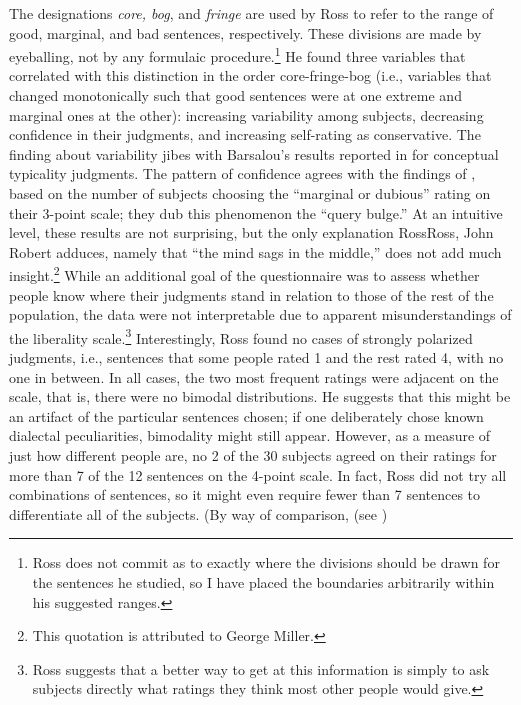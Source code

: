 The designations \textit{core, bog}, and \textit{fringe} are used by Ross to refer to the range of good, marginal, and bad sentences, respectively. These divisions are made by eyeballing, not by any formulaic procedure.\footnote{Ross does not commit as to exactly where the divisions should be drawn for the sentences he studied, so I have placed the boundaries arbitrarily within his suggested ranges.}
 He found three variables that correlated with this distinction in the order core-fringe-bog (i.e., variables that changed monotonically such that good sentences were at one extreme and mar\-ginal ones at the other): increasing variability among subjects, decreasing confidence in their judgments, and increasing self-rating as conservative. The finding about variability jibes with Barsalou's results reported in  for conceptual typicality judgments. The pattern of confidence agrees with the findings of \citet[52, fig. 9]{QuirkEtAl1966}, based on the number of subjects choosing the ``marginal or dubious'' rating on their 3-point scale; they dub this phenomenon the ``query bulge.'' At an intuitive level, these results are not surprising, but the only explanation Ross{Ross, John Robert} adduces, namely that ``the mind sags in the middle,'' does not add much insight.\footnote{This quotation is attributed to George Miller.}
 While an additional goal of the questionnaire was to assess whether people know where their judgments stand in relation to those of the rest
of the population, the data were not interpretable due to apparent misunderstandings of the liberality scale.\footnote{Ross suggests that a better way to get at this information is simply to ask subjects directly what ratings they think most other people would give.}
 Interestingly, Ross found no cases of strongly polarized judgments, i.e., sentences that some people rated 1 and the rest rated 4, with no one in between. In all cases, the two most frequent ratings were adjacent on the scale, that is, there were no bimodal distributions. He suggests that this might be an artifact of the particular sentences chosen; if one deliberately chose known dialectal peculiarities, bimodality might still appear. However, as a measure of just how different people are, no 2 of the 30 subjects agreed on their ratings for more than 7 of the 12 sentences on the 4-point scale. In fact, Ross did not try all combinations of sentences, so it might even require fewer than 7 sentences to differentiate all of the subjects. (By way of comparison, \citet{QuirkEtAl1966} (see )
